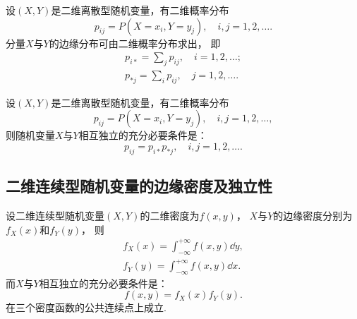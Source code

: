 \begin{theorem}
设\((X,Y)\)是二维离散型随机变量，有二维概率分布\[
	p_{ij} = P(X=x_i,Y=y_j), \quad i,j=1,2,\dotsc.
\]
分量\(X\)与\(Y\)的边缘分布可由二维概率分布求出，
即\begin{align*}
	p_{i*} = \sum_{j}{p_{ij}}, \quad i=1,2,\dotsc; \\
	p_{*j} = \sum_{i}{p_{ij}}, \quad j=1,2,\dotsc.
\end{align*}
\end{theorem}

\begin{theorem}\label{theorem:多维随机变量及其分布.两个离散型随机变量相互独立的充分必要条件}
设\((X,Y)\)是二维离散型随机变量，有二维概率分布\[
	p_{ij} = P(X=x_i,Y=y_j), \quad i,j=1,2,\dotsc,
\]
则随机变量\(X\)与\(Y\)相互独立的充分必要条件是：\[
	p_{ij} = p_{i*} p_{*j}, \quad i,j=1,2,\dotsc.
\]
\end{theorem}

\subsection{二维连续型随机变量的边缘密度及独立性}
\begin{theorem}\label{theorem:多维随机变量及其分布.两个连续型随机变量相互独立的充分必要条件}
设二维连续型随机变量\((X,Y)\)的二维密度为\(f(x,y)\)，
\(X\)与\(Y\)的边缘密度分别为\(f_X(x)\)和\(f_Y(y)\)，
则\begin{align*}
	f_X(x) = \int_{-\infty}^{+\infty} f(x,y) \dd{y}, \\
	f_Y(y) = \int_{-\infty}^{+\infty} f(x,y) \dd{x}.
\end{align*}
而\(X\)与\(Y\)相互独立的充分必要条件是：\[
	f(x,y) = f_X(x) f_Y(y).
\]在三个密度函数的公共连续点上成立.
\end{theorem}
